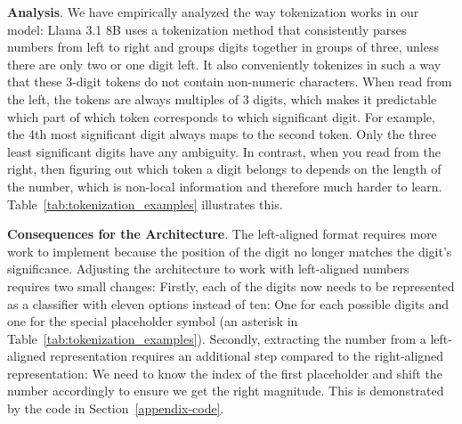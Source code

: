 \documentclass[11pt]{article}
\begin{document}
\textbf{Analysis}.
We have empirically analyzed the way tokenization works in our model:
Llama 3.1 8B uses a tokenization method that consistently parses numbers from left to right and groups digits together in groups of three, unless there are only two or one digit left. It also conveniently tokenizes in such a way that these 3-digit tokens do not contain non-numeric characters.
When read from the left, the tokens are always multiples of 3 digits, which makes it predictable which part of which token corresponds to which significant digit. For example, the 4th most significant digit always maps to the second token. Only the three least significant digits have any ambiguity.
In contrast, when you read from the right, then figuring out which token a digit belongs to depends on the length of the number, which is non-local information and therefore much harder to learn.
Table~\ref{tab:tokenization_examples} illustrates this.




\textbf{Consequences for the Architecture}.
The left-aligned format requires more work to implement because the position of the digit no longer matches the digit's significance.
Adjusting the architecture to work with left-aligned numbers requires two small changes:
Firstly, each of the digits now needs to be represented as a classifier with eleven options instead of ten: One for each possible digits and one for the special placeholder symbol (an asterisk in Table~\ref{tab:tokenization_examples}).
Secondly, extracting the number from a left-aligned representation requires an additional step compared to the right-aligned representation: We need to know the index of the first placeholder and shift the number accordingly to ensure we get the right magnitude.
This is demonstrated by the code in Section~\ref{appendix-code}.
\end{document}
